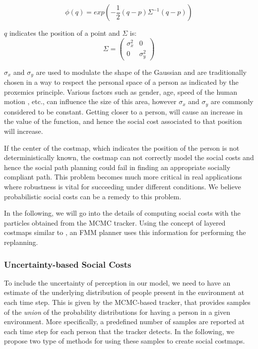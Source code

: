 \begin{equation}
\phi(q) = exp(-\frac{1}{2}(q-p)\Sigma^{-1}(q-p))
\end{equation}

$q$ indicates the position of a point and $\Sigma$ is:
\begin{equation}
\Sigma = \begin{pmatrix}
{\sigma}_{x}^2  & 0\\ 
 0& {\sigma}_{y}^2 
\end{pmatrix}
\end{equation}

${\sigma}_{x}$ and ${\sigma}_{y}$ are used to modulate the shape of the Gaussian and are traditionally chosen in a way to respect the personal space of a person as indicated by the proxemics principle. Various factors such as gender, age, speed of the human motion \cite{kirby2009companion}, etc., can influence the size of this area, however ${\sigma}_{x}$ and ${\sigma}_{y}$ are commonly considered to be constant. Getting closer to a person, will cause an increase in the value of the function, and hence the social cost associated to that position will increase.

If the center of the costmap, which indicates the position of the person is not deterministically known, the costmap can not correctly model the social costs and hence the social path planning could fail in finding an appropriate socially compliant path. This problem becomes much more critical in real applications where robustness is vital for succeeding under different conditions. We believe probabilistic social costs can be a remedy to this problem. 


In the following, we will go into the details of computing social costs with the particles obtained from the MCMC tracker. Using the concept of layered costmaps similar to \cite{lu2014iros},  an FMM planner uses this information for performing the replanning. 
\subsubsection{Uncertainty-based Social Costs}

To include the uncertainty of perception in our model, we need to have an estimate of the underlying distribution of people present in the environment at each time step. This is given by the MCMC-based tracker, that provides samples of the \textit{union} of the probability distributions for having a person in a given environment. More specifically, a predefined number of samples are reported at each time step for each person that the tracker detects. In the following, we propose two type of methods for using these samples to create social costmaps.  

